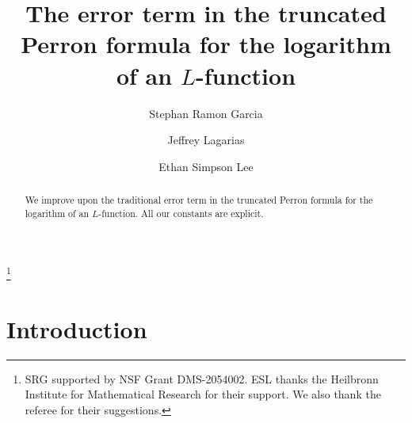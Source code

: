 \documentclass[10pt,reqno]{amsart}
\theoremstyle{plain}
\theoremstyle{definition}
\begin{document}
\title[The error term in the truncated Perron formula]{The error term in the truncated Perron formula for the logarithm of an $L$-function}

	\author[S.~R.~Garcia]{Stephan Ramon Garcia}
	\address{Department of Mathematics and Statistics, Pomona College, 610 N. College Ave., Claremont, CA 91711, USA} 

    \author[J.~Lagarias]{Jeffrey Lagarias}
    \address{Department of Mathematics, University of Michigan, 530 Church Street, Ann Arbor, MI 48109, USA}
           	
    \author[E.~S.~Lee]{Ethan Simpson Lee}
    \address{University of Bristol, School of Mathematics, Fry Building, Woodland Road, Bristol, BS8 1UG} 

\begin{abstract}
We improve upon the traditional error term in the truncated Perron formula for the logarithm of an $L$-function. All our constants are explicit.
\end{abstract}

\thanks{SRG supported by NSF Grant DMS-2054002. ESL
thanks the Heilbronn Institute for Mathematical Research for their support. We also thank the referee for their suggestions.}

\maketitle




\vspace{-20pt}
\section{Introduction}
\end{document}
